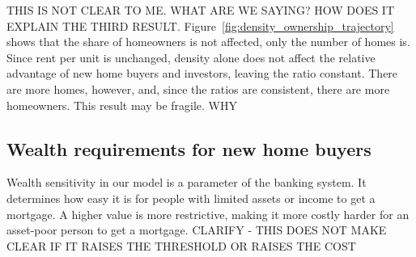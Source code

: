 {\color{red} THIS IS NOT CLEAR TO ME. WHAT ARE WE SAYING? HOW DOES IT EXPLAIN THE THIRD RESULT.}
Figure~\ref{fig:density_ownership_trajectory} shows that the share of homeowners is not affected, only the number of homes is. Since rent per unit is unchanged, density alone does not affect the relative advantage of new home buyers and investors, leaving the ratio constant. There are more homes, however, and, since the ratios are consistent, there are more homeowners. This result may be fragile. {\color{red} WHY}

\newpage

\subsection{Wealth requirements for new home buyers}
Wealth sensitivity in our model is a parameter of the banking system. It determines how easy it is for people with limited assets or income to get a mortgage. A higher value is more restrictive,  making it more costly harder for an asset-poor person to get a mortgage.
{\color{red} CLARIFY - THIS DOES NOT MAKE CLEAR IF IT RAISES THE THRESHOLD OR RAISES THE COST}

